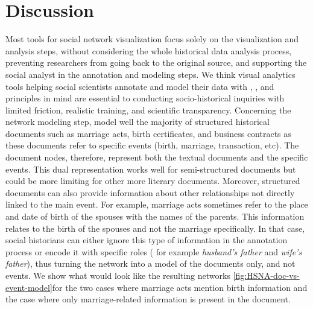 \section{Discussion}


Most tools for social network visualization focus solely on the visualization and analysis steps, without considering the whole historical data analysis process, preventing researchers from going back to the original source, and supporting the social analyst in the annotation and modeling steps.
We think visual analytics tools helping social scientists annotate and model their data with \reality, \traceability, and \simplicity principles in mind are essential to conducting socio-historical inquiries with limited friction, realistic training, and scientific transparency.
Concerning the network modeling step, \modelplural model well the majority of structured historical documents such as marriage acts, birth certificates, and business contracts as these documents refer to specific events (birth, marriage, transaction, etc).
The document nodes, therefore, represent both the textual documents and the specific events.
This dual representation works well for semi-structured documents but could be more limiting for other more literary documents.
Moreover, structured documents can also provide information about other relationships not directly linked to the main event.
For example, marriage acts sometimes refer to the place and date of birth of the spouses with the names of the parents.
This information relates to the birth of the spouses and not the marriage specifically.
In that case, social historians can either ignore this type of information in the annotation process or encode it with specific roles ( for example \textit{husband's father} and \textit{wife's father}), thus turning the network into a model of the documents only, and not events.
We show what would look like the resulting networks \autoref{fig:HSNA-doc-vs-event-model}for the two cases where marriage acts mention birth information and the case where only marriage-related information is present in the document.

